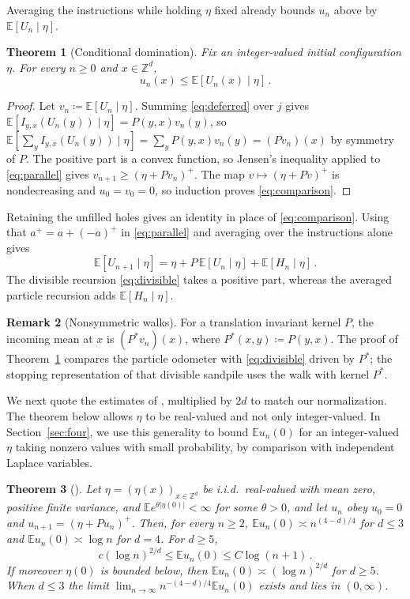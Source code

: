 \documentclass[11pt]{amsart}
\theoremstyle{plain}
\newtheorem{theorem}{Theorem}[section]
\theoremstyle{definition}
\newtheorem{remark}[theorem]{Remark}
\newcommand{\Z}{\mathbb{Z}}
\newcommand{\E}{\mathbb{E}}
\begin{document}
Averaging the instructions while holding $\eta$ fixed already bounds $u_n$ above
by $\E[U_n\mid\eta]$.

\begin{theorem}[Conditional domination]\label{thm:comparison}
	Fix an integer-valued initial configuration $\eta$. For every $n\geq0$ and
	$x\in\Z^d$,
	\begin{equation}\label{eq:comparison}
		u_n(x)\leq\E[U_n(x)\mid\eta]\,.
	\end{equation}
\end{theorem}

\begin{proof}
	Let $v_n\coloneqq\E[U_n\mid\eta]$. Summing \eqref{eq:deferred} over $j$ gives
	$\E[I_{y,x}(U_n(y))\mid\eta]=P(y,x)v_n(y)$, so
	$\E[\sum_yI_{y,x}(U_n(y))\mid\eta]=\sum_yP(y,x)v_n(y)=(Pv_n)(x)$ by symmetry
	of $P$. The positive part is a convex function, so Jensen's inequality applied to
	\eqref{eq:parallel} gives $v_{n+1}\geq(\eta+Pv_n)^+$. The map $v\mapsto(\eta+Pv)^+$ is nondecreasing and $u_0=v_0=0$, so induction
	proves
	\eqref{eq:comparison}.
\end{proof}

Retaining the unfilled holes gives an identity in place of \eqref{eq:comparison}.
Using that $a^+=a+(-a)^+$ in \eqref{eq:parallel} and averaging over the instructions
alone gives
\[
	\E[U_{n+1}\mid\eta]=\eta+P\,\E[U_n\mid\eta]+\E[H_n\mid\eta]\,.
\]
The divisible recursion \eqref{eq:divisible} takes a positive part, whereas the
averaged particle recursion adds $\E[H_n\mid\eta]$.

\begin{remark}[Nonsymmetric walks]\label{rem:transpose}
	For a translation invariant kernel $P$, the incoming mean at $x$ is
	$(P^*v_n)(x)$, where $P^*(x,y)\coloneqq P(y,x)$. The proof of Theorem~\ref{thm:comparison} compares the particle odometer with
	\eqref{eq:divisible} driven by $P^*$; the stopping representation of that
	divisible sandpile uses the walk with kernel $P^*$.
\end{remark}

We next quote the estimates of \citet{BP}, multiplied by $2d$ to match our
normalization. The theorem below allows $\eta$ to be real-valued and not
only integer-valued. In Section~\ref{sec:four}, we use this generality to bound
$\E u_n(0)$ for an integer-valued $\eta$ taking nonzero values with small
probability, by comparison with independent Laplace variables.

\begin{theorem}[{\citealp[Theorem~1.3, Corollary~6.2, Theorem~6.6,
and (94)]{BP}}]
\label{thm:BP}
	Let $\eta=(\eta(x))_{x\in\Z^d}$ be i.i.d.\ real-valued with mean zero, positive finite
	variance, and $\E e^{\theta|\eta(0)|}<\infty$ for some $\theta>0$, and
	let $u_n$ obey $u_0=0$ and $u_{n+1}=(\eta+Pu_n)^+$. Then, for every $n\geq2$,
	$\E u_n(0)\asymp n^{(4-d)/4}$ for $d\leq3$ and $\E u_n(0)\asymp\log n$ for
	$d=4$. For $d\geq5$,
	\[
		c(\log n)^{2/d}\leq\E u_n(0)\leq C\log(n+1)\,.
	\]
	If moreover $\eta(0)$ is bounded below, then $\E u_n(0)\asymp(\log n)^{2/d}$
	for $d\geq5$. When $d\leq3$ the limit
	$\lim_{n\to\infty}n^{-(4-d)/4}\E u_n(0)$ exists and lies in $(0,\infty)$.
\end{theorem}
\end{document}

